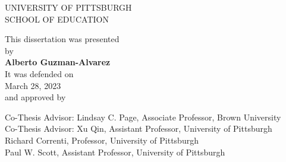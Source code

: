 
\setcounter{page}{2}

\pagestyle{plain}

\begin{center}
UNIVERSITY OF PITTSBURGH\\
SCHOOL OF EDUCATION
\end{center}

       \vspace*{8\baselineskip}


\begin{center}
This dissertation was presented\\
by\\
       \vspace*{1\baselineskip}
\textbf{Alberto Guzman-Alvarez}\\
       \vspace*{1\baselineskip}
It was defended on\\
March 28, 2023\\
and approved by
\end{center}

\begin{center}
Co-Thesis Advisor: Lindsay C. Page, Associate Professor, Brown University\\
Co-Thesis Advisor: Xu Qin, Assistant Professor, University of Pittsburgh\\
Richard Correnti, Professor, University of Pittsburgh\\
Paul W. Scott, Assistant Professor, University of Pittsburgh\\
\end{center}

\newpage
